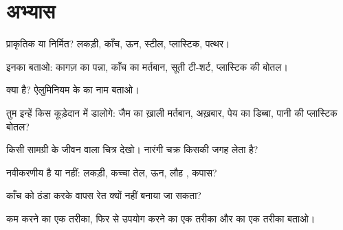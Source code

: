\section{अभ्यास}

\begin{exercise}[$\star$]\label{exo:g5:raw-materials-and-recycling:1}
प्राकृतिक या निर्मित? लकड़ी, काँच, ऊन, स्टील, प्लास्टिक, पत्थर।
\end{exercise}

\begin{exercise}[$\star$]\label{exo:g5:raw-materials-and-recycling:2}
इनका  बताओ: कागज़ का पन्ना, काँच का मर्तबान, सूती
टी-शर्ट, प्लास्टिक की बोतल।
\end{exercise}

\begin{exercise}[$\star$]\label{exo:g5:raw-materials-and-recycling:3}
 क्या है? ऐलुमिनियम के  का नाम बताओ।
\end{exercise}

\begin{exercise}[$\star$]\label{exo:g5:raw-materials-and-recycling:4}
तुम इन्हें किस कूड़ेदान में डालोगे: जैम का ख़ाली मर्तबान, अख़बार, पेय का डिब्बा,
पानी की प्लास्टिक बोतल?
\end{exercise}

\begin{exercise}[$\star$]\label{exo:g5:raw-materials-and-recycling:5}
किसी सामग्री के जीवन वाला चित्र देखो। नारंगी चक्र किसकी जगह
लेता है?
\end{exercise}

\begin{exercise}[$\star$]\label{exo:g5:raw-materials-and-recycling:6}
नवीकरणीय है या नहीं: लकड़ी, कच्चा तेल, ऊन, लौह , कपास?
\end{exercise}

\begin{exercise}[$\star$]\label{exo:g5:raw-materials-and-recycling:7}
काँच को ठंडा करके वापस रेत क्यों नहीं बनाया जा सकता?
\end{exercise}

\begin{exercise}[$\star$]\label{exo:g5:raw-materials-and-recycling:8}
कम करने का एक तरीका, फिर से उपयोग करने का एक तरीका और  का एक तरीका बताओ।
\end{exercise}

